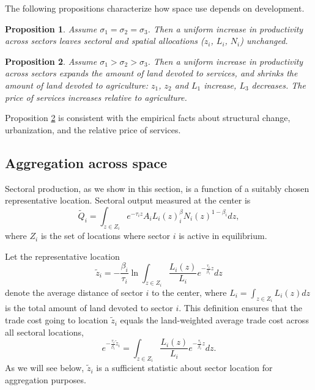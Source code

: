 \documentclass[12pt]{article}
\newtheorem{proposition}{Proposition}
\begin{document}
The following propositions characterize how space use depends on development.
\begin{proposition}\label{prop:balanced_growth}
Assume $\sigma_1=\sigma_2=\sigma_3$. Then a uniform increase in productivity across sectors leaves sectoral and spatial allocations ($z_i$, $L_i$, $N_i$) unchanged.
\end{proposition}

\begin{proposition}\label{prop:comparative_static}
Assume $\sigma_1>\sigma_2>\sigma_3$. Then a uniform increase in productivity across sectors expands the amount of land devoted to services, and shrinks the amount of land devoted to agriculture: $z_1$, $z_2$ and $L_1$ increase, $L_3$ decreases. The price of services increases relative to agriculture.
\end{proposition}

Proposition \ref{prop:comparative_static} is consistent with the empirical facts about structural change, urbanization, and the relative price of services. 

\subsection{Aggregation across space}
Sectoral production, as we show in this section, is a function of a suitably chosen representative location. Sectoral output measured at the center is
\begin{equation*}
\tilde{Q}_i=\int_{z\in Z_i}e^{-\tau_i z}A_iL_i(z)^\beta_iN_i(z)^{1-\beta_i}dz,
\end{equation*}
where $Z_i$ is the set of locations where sector $i$ is active in equilibrium.

Let the representative location
\begin{equation}
\label{eq:ReprLoc}
\tilde z_i = -
\frac{\beta_i}{\tau_i}
\ln\int_{z\in Z_i} \frac{L_i(z)}{L_i}e^{-\frac{\tau_i}{\beta_i} z}dz
\end{equation}
denote the average distance of sector $i$ to the center, where $L_i=\int_{z\in Z_i} L_i(z)dz$ is the total amount of land devoted to sector $i$. This definition ensures that the trade cost going to location $\tilde z_i$ equals the land-weighted average trade cost across all sectoral locations,
\[
e^{-\frac{\tau_i}{\beta_i} \tilde z_i} = \int_{z\in Z_i} \frac{L_i(z)}{L_i}e^{-\frac{\tau_i}{\beta_i} z}dz.
\]
As we will see below, $\tilde z_i$ is a sufficient statistic about sector location for aggregation purposes. %
\end{document}

